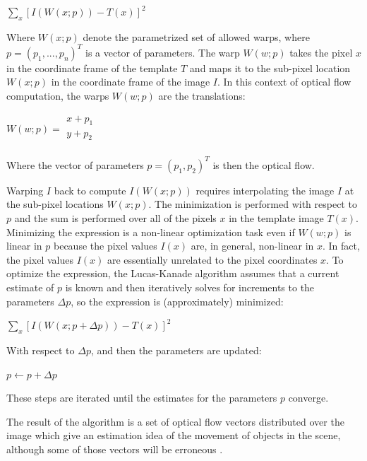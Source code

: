 \documentclass[msc, a4paper, classic, en]{ufbathesis}
\begin{document}
\begin{center}
  $\sum_{x}{[I(W(x;p))-T(x)]^2}$
\end{center}

Where $W(x;p)$ denote the parametrized set of allowed warps, where $p = (p_1,...,p_n)^T$ is a vector of parameters. The warp $W(w;p)$ takes the pixel $x$ in the coordinate frame of the template $T$ and maps it to the sub-pixel location $W(x;p)$ in the coordinate frame of the image $I$. In this context of optical flow computation, the warps $W(w;p)$ are the translations:

\begin{center}
$W(w;p) = \begin{matrix}
          x + p_1 \\
          y + p_2 \\
          \end{matrix}$
\end{center}

Where the vector of parameters $p = (p_1, p_2)^T$ is then the optical flow.

Warping $I$ back to compute $I(W(x;p))$ requires interpolating the image $I$ at the sub-pixel locations $W(x;p)$. The minimization is performed with respect to $p$ and the sum is performed over all of the pixels $x$ in the template image $T(x)$. Minimizing the expression is a non-linear optimization task even if $W(w;p)$ is linear in $p$ because the pixel values $I(x)$ are, in general, non-linear in $x$. In fact, the pixel values $I(x)$ are essentially unrelated to the pixel coordinates $x$. To optimize the expression, the Lucas-Kanade algorithm assumes that a current estimate of $p$ is known and then iteratively solves for increments to the parameters $\Delta{p}$, so the expression is (approximately) minimized:

\begin{center}
  $\sum_{x}{[I(W(x;p + \Delta{p}))-T(x)]^2}$
\end{center}

With respect to $\Delta{p}$, and then the parameters are updated:

\begin{center}
  $p \gets p + \Delta{p}$
\end{center}

These steps are iterated until the estimates for the parameters $p$ converge.

The result of the algorithm is a set of optical flow vectors distributed over the image which give an estimation idea of the movement of objects in the scene, although some of those vectors will be erroneous \cite{raul}.
\end{document}
